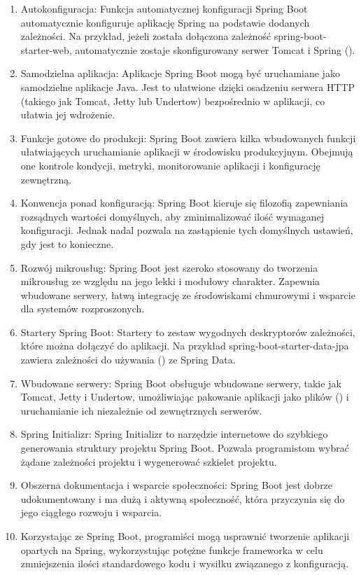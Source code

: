 \begin{enumerate}
    \item Autokonfiguracja: Funkcja automatycznej konfiguracji Spring Boot automatycznie konfiguruje aplikację Spring na podstawie dodanych zależności. Na przykład, jeżeli została dołączona zależność spring-boot-starter-web, automatycznie zostaje skonfigurowany serwer Tomcat i Spring  ()\cite{springbootFeatures}.
    \item Samodzielna aplikacja: Aplikacje Spring Boot mogą być uruchamiane jako samodzielne aplikacje Java. Jest to ułatwione dzięki osadzeniu serwera HTTP (takiego jak Tomcat, Jetty lub Undertow) bezpośrednio w aplikacji, co ułatwia jej wdrożenie\cite{springbootFeatures}.
    \item Funkcje gotowe do produkcji: Spring Boot zawiera kilka wbudowanych funkcji ułatwiających uruchamianie aplikacji w środowisku produkcyjnym. Obejmują one kontrole kondycji, metryki, monitorowanie aplikacji i konfigurację zewnętrzną\cite{springbootFeatures}.
    \item Konwencja ponad konfiguracją: Spring Boot kieruje się filozofią zapewniania rozsądnych wartości domyślnych, aby zminimalizować ilość wymaganej konfiguracji. Jednak nadal pozwala na zastąpienie tych domyślnych ustawień, gdy jest to konieczne\cite{springbootFeatures}.
    \item Rozwój mikrousług: Spring Boot jest szeroko stosowany do tworzenia mikrousług ze względu na jego lekki i modułowy charakter. Zapewnia wbudowane serwery, łatwą integrację ze środowiskami chmurowymi i wsparcie dla systemów rozproszonych\cite{springbootFeatures}.
    \item Startery Spring Boot: Startery to zestaw wygodnych deskryptorów zależności, które można dołączyć do aplikacji. Na przykład spring-boot-starter-data-jpa zawiera zależności do używania  () ze Spring Data\cite{springbootFeatures}.
    \item Wbudowane serwery: Spring Boot obsługuje wbudowane serwery, takie jak Tomcat, Jetty i Undertow, umożliwiając pakowanie aplikacji jako plików  () i uruchamianie ich niezależnie od zewnętrznych serwerów\cite{springbootFeatures}.
    \item Spring Initializr: Spring Initializr to narzędzie internetowe do szybkiego generowania struktury projektu Spring Boot. Pozwala programistom wybrać żądane zależności projektu i wygenerować szkielet projektu\cite{springbootFeatures}.
    \item Obszerna dokumentacja i wsparcie społeczności: Spring Boot jest dobrze udokumentowany i ma dużą i aktywną społeczność, która przyczynia się do jego ciągłego rozwoju i wsparcia\cite{springbootFeatures}.
    \item Korzystając ze Spring Boot, programiści mogą usprawnić tworzenie aplikacji opartych na Spring, wykorzystując potężne funkcje frameworka w celu zmniejszenia ilości standardowego kodu i wysiłku związanego z konfiguracją\cite{springbootFeatures}.
\end{enumerate}

